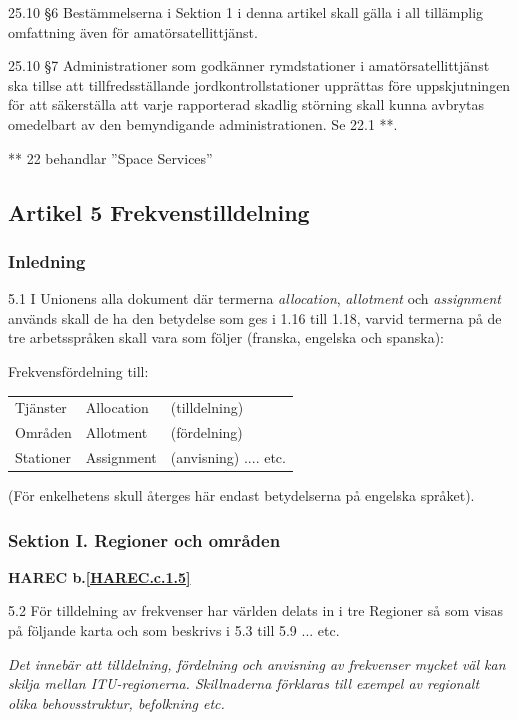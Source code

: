 \begin{multicols}{2}
25.10 \S6 Bestämmelserna i Sektion 1 i denna artikel skall gälla i all
tillämplig omfattning även för amatörsatellittjänst.
\cite[25.10]{ITU-RR}

25.10 \S7 Administrationer som godkänner rymdstationer i amatörsatellittjänst
ska tillse att tillfredsställande jordkontrollstationer upprättas före
uppskjutningen för att säkerställa att varje rapporterad skadlig störning
skall kunna avbrytas omedelbart av den bemyndigande administrationen.
Se 22.1 **.
\cite[25.11]{ITU-RR}

** 22 behandlar ''Space Services''

\subsection{Artikel 5 Frekvenstilldelning}

\subsubsection{Inledning}

5.1 I Unionens alla dokument där termerna \emph{allocation},
\emph{allotment} och \emph{assignment} används skall de ha den
betydelse som ges i 1.16 till 1.18, varvid termerna på de tre
arbetsspråken skall vara som följer (franska, engelska och spanska):
\cite[5.1]{ITU-RR}

Frekvensfördelning till:
\begin{tabular}{lll}
  Tjänster & Allocation & (tilldelning) \\
  Områden & Allotment & (fördelning) \\
  Stationer & Assignment & (anvisning) .... etc. \\
\end{tabular}

(För enkelhetens skull återges här endast betydelserna på engelska språket).

\subsubsection{Sektion I. Regioner och områden}
\textbf{
HAREC b.\ref{HAREC.c.1.5}\label{myHAREC.c.1.5}
}

5.2 För tilldelning av frekvenser har världen delats in i tre
Regioner så som visas på följande karta och som beskrivs i 5.3 till
5.9 ... etc.
\cite[5.2]{ITU-RR}

\emph{ Det innebär att tilldelning, fördelning och anvisning av frekvenser
  mycket väl kan skilja mellan ITU-regionerna.
  Skillnaderna förklaras till exempel av regionalt olika behovsstruktur, befolkning
  etc.}


\end{multicols}
